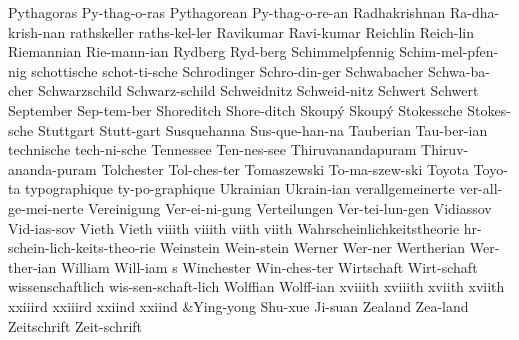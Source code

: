 \1 Pythagoras		Py-thag-o-ras		%
\1 Pythagorean		Py-thag-o-re-an		%
\1 Radhakrishnan	Ra-dha-krish-nan   %
\1 rathskeller		raths-kel-ler
\NewWordtrue
\1 Ravikumar		Ravi-kumar		%
\NewWordtrue
\1 Reichlin		Reich-lin		%
\1 Riemannian		Rie-mann-ian
\1 Rydberg		Ryd-berg
\NewWordtrue
\1 Schimmelpfennig	Schim-mel-pfen-nig	%
\1 schottische		schot-ti-sche
\1 Schrodinger		Schro-din-ger
\1 Schwabacher		Schwa-ba-cher
\1 Schwarzschild	Schwarz-schild
\1 Schweidnitz		Schweid-nitz		%
\NewWordtrue
\1 Schwert		Schwert			%
\1 September		Sep-tem-ber
\1 Shoreditch		Shore-ditch		%
\1 Skoup\'y		Skoup\'y		%
\1 Stokessche		Stokes-sche
\1 Stuttgart		Stutt-gart
\1 Susquehanna		Sus-que-han-na
\1 Tauberian		Tau-ber-ian          %
\1 technische		tech-ni-sche
\1 Tennessee		Ten-nes-see
\NewWordtrue
\1 Thiruvanandapuram	Thiruv-ananda-puram	%
\1 Tolchester		Tol-ches-ter		%
\1 Tomaszewski		To-ma-szew-ski		%
\NewWordtrue
\1 Toyota		Toyo-ta			%
\1 typographique	ty-po-graphique      %
\1 Ukrainian		Ukrain-ian
\1 verallgemeinerte	ver-all-ge-mei-nerte
\1 Vereinigung		Ver-ei-ni-gung
\1 Verteilungen 	Ver-tei-lun-gen
\1 Vidiassov		Vid-ias-sov		%
\1 Vieth		Vieth			%
\1 viiith		viiith			%
\1 viith		viith			%
\1 Wahrscheinlichkeitstheorie  hr-schein-lich-keits-theo-rie
\NewWordtrue
\1 Weinstein		Wein-stein		%
\1 Werner		Wer-ner		%
\1 Wertherian		Wer-ther-ian
\NewWordtrue
\2 William		Will-iam s		%
\1 Winchester		Win-ches-ter
\1 Wirtschaft		Wirt-schaft		%
\1 wissenschaftlich	wis-sen-schaft-lich
\NewWordtrue
\1 Wolffian		Wolff-ian		%
\1 xviiith		xviiith			%
\1 xviith		xviith			%
\1 xxiiird		xxiiird			%
\1 xxiind		xxiind			%
\tabalign {}&Ying-yong Shu-xue Ji-suan\cr
\1 Zealand		Zea-land
\1 Zeitschrift		Zeit-schrift
\endgraf
\endgroup

\makesignature
\endarticle
